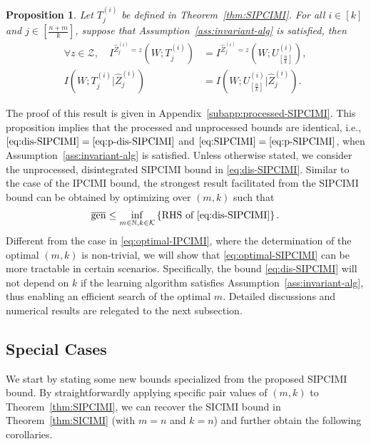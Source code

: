 \documentclass[onecolumn,romanappendices,10pt]{IEEEtran}
\newtheorem{proposition}{Proposition}
\newcommand{\Kcal}{{\mathcal K}}
\newcommand{\Zcal}{{\mathcal Z}}
\newcommand{\NN}{{\mathbb{N}}}
\DeclareMathOperator{\gen}{\overline{gen}}
\begin{document}
	\begin{proposition}\label{pro:processed-SIPCIMI}
		Let $T^{(i)}_j$ be defined in Theorem~\ref{thm:SIPCIMI}. For all $i \in [k]$ and $j \in [\frac{n+m}{k}]$, suppose that Assumption~\ref{ass:invariant-alg} is satisfied, then
		\begin{align} \label{eq:processed-SIPCIMI} 
			\forall z \in \Zcal, \quad I^{\hat{Z}^{(i)}_j = z}\left( W; T^{(i)}_j \right) &= I^{\hat{Z}^{(i)}_j = z}\left( W; U^{(i)}_{[\frac{n}{k}]} \right), \\
			I\left( W; T^{(i)}_j | \hat{Z}^{(i)}_j \right) &= I\left( W; U^{(i)}_{[\frac{n}{k}]} | \hat{Z}^{(i)}_j \right).
		\end{align}
	\end{proposition}
	
	The proof of this result is given in Appendix~\ref{subapp:processed-SIPCIMI}. This proposition implies that the processed and unprocessed bounds are identical, i.e., $\eqref{eq:dis-SIPCIMI} = \eqref{eq:p-dis-SIPCIMI}$ and $\eqref{eq:SIPCIMI} = \eqref{eq:p-SIPCIMI}$, when Assumption~\ref{ass:invariant-alg} is satisfied. Unless otherwise stated, we consider the unprocessed, disintegrated SIPCIMI bound in \eqref{eq:dis-SIPCIMI}. Similar to the case of the IPCIMI bound, the strongest result facilitated from the SIPCIMI bound can be obtained by optimizing over $(m, k)$ such that
	\begin{align}
		\gen \leq \inf_{m \in \NN, k \in \Kcal} \left\{ \textnormal{RHS of \eqref{eq:dis-SIPCIMI}} \right\}. \label{eq:optimal-SIPCIMI}
	\end{align}
	Different from the case in \eqref{eq:optimal-IPCIMI}, where the determination of the optimal $(m, k)$ is non-trivial, we will show that \eqref{eq:optimal-SIPCIMI} can be more tractable in certain scenarios. Specifically, the bound \eqref{eq:dis-SIPCIMI} will not depend on $k$ if the learning algorithm satisfies Assumption~\ref{ass:invariant-alg}, thus enabling an efficient search of the optimal $m$. Detailed discussions and numerical results are relegated to the next subsection.
	
	\subsection{Special Cases}\label{subsec:SIPCIMI-cases}
	We start by stating some new bounds specialized from the proposed SIPCIMI bound. By straightforwardly applying specific pair values of $(m,k)$ to Theorem~\ref{thm:SIPCIMI}, we can recover the SICIMI bound in Theorem~\ref{thm:SICIMI} (with $m=n$ and $k=n$) and further obtain the following corollaries.
	
\end{document}
